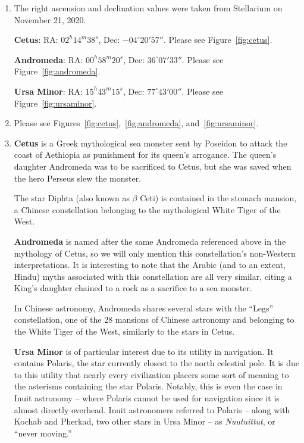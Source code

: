 \documentclass[11pt]{article}
\begin{document}
\begin{enumerate}[label={\textbf{\emph{(\arabic*)}}}]
	\item %
The right ascension and declination values were taken from Stellarium \cite{stellarium} on November 21, 2020.

\textbf{Cetus}: RA: $02^h 14^m 38^s$, Dec: $-04^\circ 20' 57''$.
Please see Figure~\ref{fig:cetus}.

\textbf{Andromeda}: RA: $00^h 58^m 20^s$, Dec: $36^\circ 07' 33''$.
Please see Figure~\ref{fig:andromeda}.

\textbf{Ursa Minor}: RA: $15^h 43^m 15^s$, Dec: $77^\circ 43' 00''$.
Please see Figure~\ref{fig:ursaminor}.

	\item %
Please see Figures~\ref{fig:cetus},~\ref{fig:andromeda}, and~\ref{fig:ursaminor}.

	\item %
\textbf{Cetus} is a Greek mythological sea monster sent by Poseidon to attack the coast of Aethiopia as punishment for its queen's arrogance.
The queen's daughter Andromeda was to be sacrificed to Cetus, but she was saved when the hero Perseus slew the monster.

The star Diphta (also known as $\beta$ Ceti) is contained in the stomach mansion, a Chinese constellation belonging to the mythological White Tiger of the West.
\cite{cetus-wiki}

\textbf{Andromeda} is named after the same Andromeda referenced above in the mythology of Cetus, so we will only mention this constellation's non-Western interpretations.
It is interesting to note that the Arabic (and to an extent, Hindu) myths associated with this constellation are all very similar, citing a King's daughter chained to a rock as a sacrifice to a sea monster.

In Chinese astronomy, Andromeda shares several stars with the ``Legs'' constellation, one of the 28 mansions of Chinese astronomy and belonging to the White Tiger of the West, similarly to the stars in Cetus.
\cite{andromeda-wiki}

\textbf{Ursa Minor} is of particular interest due to its utility in navigation.
It contains Polaris, the star currently closest to the north celestial pole.
It is due to this utility that nearly every civilization placers some sort of meaning to the asterisms containing the star Polaris.
Notably, this is even the case in Inuit astronomy -- where Polaris cannot be used for navigation since it is almost directly overhead.
Inuit astronomers referred to Polaris -- along with Kochab and Pherkad, two other stars in Ursa Minor -- as \textit{Nuutuittut}, or ``never moving.'' \cite{arcticsky}


\end{enumerate}
\end{document}
